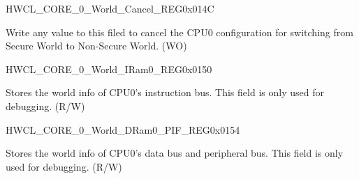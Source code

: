 \begin{register}{H}{WCL\_CORE\_0\_World\_Cancel\_REG}{0x{}014C}\label{regdesc:WCLCORE0WORLDCANCELREG}
%
\regnewline%
\begin{regdesc}\begin{reglist}
\label{fielddesc:WCLCORE0WORLDCANCEL}\item [WCL\_CORE\_0\_WORLD\_CANCEL] Write any value to this filed to cancel the CPU0 configuration for switching from Secure World to Non-Secure World. (WO)
\end{reglist}\end{regdesc}
\end{register}


\begin{register}{H}{WCL\_CORE\_0\_World\_IRam0\_REG}{0x{}0150}\label{regdesc:WCLCORE0WORLDIRAM0REG}
%
%
\regnewline%
\begin{regdesc}\begin{reglist}
\label{fielddesc:WCLCORE0WORLDIRAM0}\item [WCL\_CORE\_0\_WORLD\_IRAM0] Stores the world info of CPU0's instruction bus. This field is only used for debugging. (R/W)
\end{reglist}\end{regdesc}
\end{register}


\begin{register}{H}{WCL\_CORE\_0\_World\_DRam0\_PIF\_REG}{0x{}0154}\label{regdesc:WCLCORE0WORLDDRAM0PIFREG}
%
%
\regnewline%
\begin{regdesc}\begin{reglist}
\label{fielddesc:WCLCORE0WORLDDRAM0PIF}\item [WCL\_CORE\_0\_WORLD\_DRAM0\_PIF] Stores the world info of CPU0's data bus and peripheral bus. This field is only used for debugging. (R/W)
\end{reglist}\end{regdesc}
\end{register}


